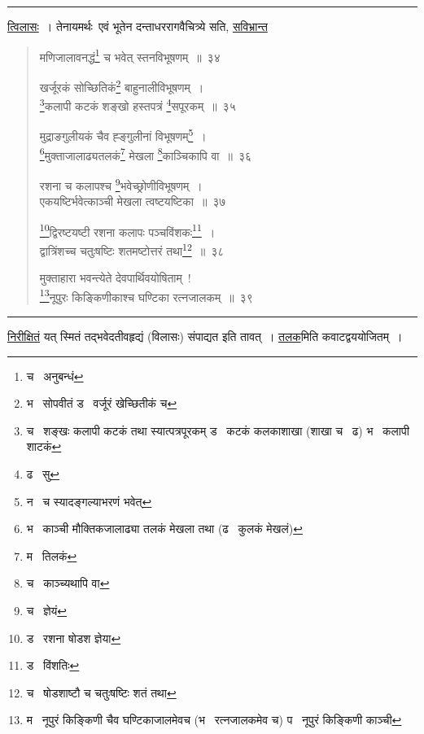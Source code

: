 \documentclass[11pt, openany]{book}
\begin{document}
\hrule

\vspace{2mm}
\noindent
\underline{त्विलासः}~। तेनायमर्थः\textendash\ एवं भूतेन दन्ताधररागवैचित्र्ये सति, \underline{सविभ्रान्त\textendash }

\newpage

\begin{quote}
{\na मणिजालावनद्धं\renewcommand{\thefootnote}{1}\footnote{च \textendash\ अनुबन्धं} च भवेत् स्तनविभूषणम्~॥~३४

खर्जूरकं सोच्छितिकं\renewcommand{\thefootnote}{2}\footnote{भ \textendash\ सोपवीतं ड \textendash\ वर्जूरं खेच्छितीकं च} बाहुनालीविभूषणम्~।\\
\renewcommand{\thefootnote}{3}\footnote{च \textendash\ शङ्खः कलापी कटकं तथा स्यात्पत्रपूरकम् ड \textendash\ कटकं कलकाशाखा (शाखा च \textendash\ ढ) भ \textendash\ कलापी शाटकं}कलापी कटकं शङ्खो हस्तपत्रं \renewcommand{\thefootnote}{4}\footnote{ढ \textendash\ सु}सपूरकम्~॥~३५

मुद्राङगुलीयकं चैव ह्ङ्गुलीनां विभूषणम्\renewcommand{\thefootnote}{5}\footnote{न \textendash\ च स्यादङ्गल्याभरणं भवेत्}~।\\
\renewcommand{\thefootnote}{6}\footnote{भ \textendash\ काञ्ची मौक्तिकजालाढ्या तलकं मेखला तथा (ढ \textendash\ कुलकं मेखलं)}मुक्ताजालाढ्यतलकं\renewcommand{\thefootnote}{7}\footnote{म \textendash\ तिलकं} मेखला \renewcommand{\thefootnote}{8}\footnote{च \textendash\ काञ्च्यथापि वा}काञ्चिकापि वा~॥~३६

रशना च कलापश्च \renewcommand{\thefootnote}{9}\footnote{च \textendash\ ज्ञेयं}भवेच्छ्रोणीविभूषणम्~।\\
एकयष्टिर्भवेत्काञ्ची मेखला त्वष्टयष्टिका~॥~३७

\renewcommand{\thefootnote}{10}\footnote{ड \textendash\ रशना षोडश ज्ञेया}द्विरष्टयष्टी रशना कलापः पञ्चविंशकः\renewcommand{\thefootnote}{11}\footnote{ड \textendash\ विंशतिः}~।\\
द्वात्रिंशच्च चतुःषष्टिः शतमष्टोत्तरं तथा\renewcommand{\thefootnote}{12}\footnote{च \textendash\ षोडशाष्टौ च चतुःषष्टिः शतं तथा}~॥~३८

मुक्ताहारा भवन्त्येते देवपार्थिवयोषिताम्~!\\
\renewcommand{\thefootnote}{13}\footnote{म \textendash\ नूपुरं किङ्किणी चैव घण्टिकाजालमेवच (भ \textendash\ रत्नजालकमेव च) प \textendash\ नूपुरं किङ्किणी काञ्ची}नूपुरः किङ्किणीकाश्च घण्टिका रत्नजालकम्~॥~३९}
\end{quote}

\hrule

\vspace{2mm}
\noindent
\underline{निरीक्षितं} यत् स्मितं तद्भवेदतीवहृद्यं (विलासः) संपाद्यत इति तावत्~। \underline{तलक}मिति कवाटद्वययोजितम्~।\\
\end{document}

